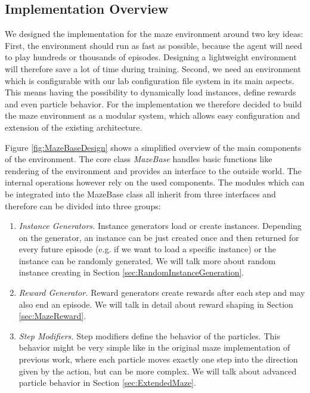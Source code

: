 \subsection{Implementation Overview} \label{sec:MazeImplementation}
We designed the implementation for the maze environment around two key ideas: First, the environment should run as fast as possible, because the agent will need to play hundreds or thousands of episodes. Designing a lightweight environment will therefore save a lot of time during training. Second, we need an environment which is configurable with our lab configuration file system in its main aspects. This means having the possibility to dynamically load instances, define rewards and even particle behavior. For the implementation we therefore decided to build the maze environment as a modular system, which allows easy configuration and extension of the existing architecture. 

Figure \ref{fig:MazeBaseDesign} shows a simplified overview of the main components of the environment. The core class \textit{MazeBase} handles basic functions like rendering of the environment and provides an interface to the outside world. The internal operations however rely on the used components. The modules which can be integrated into the MazeBase class all inherit from three interfaces and therefore can be divided into three groups:

\begin{enumerate}
    \item \textit{Instance Generators.} Instance generators load or create instances. Depending on the generator, an instance can be just created once and then returned for every future episode (e.g. if we want to load a specific instance) or the instance can be randomly generated. We will talk more about random instance creating in Section \ref{sec:RandomInstanceGeneration}.
    \item \textit{Reward Generator.} Reward generators create rewards after each step and may also end an episode. We will talk in detail about reward shaping in Section \ref{sec:MazeReward}.
    \item \textit{Step Modifiers.} Step modifiers define the behavior of the particles. This behavior might be very simple like in the original maze implementation of previous work, where each particle moves exactly one step into the direction given by the action, but can be more complex. We will talk about advanced particle behavior in Section \ref{sec:ExtendedMaze}. 
\end{enumerate}

